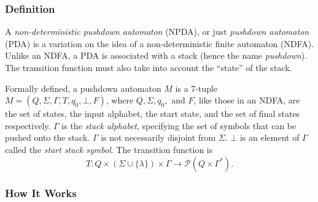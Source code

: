 \documentclass[12pt]{article}
\begin{document}

\subsubsection*{Definition}

A \emph{non-deterministic pushdown automaton} (NPDA), or just \emph{pushdown automaton} (PDA) is a variation on the idea of a non-deterministic finite automaton (NDFA).  Unlike an NDFA, a PDA is associated with a stack (hence the name \textit{pushdown}).  The transition function must also take into account the ``state'' of the stack.

Formally defined, a pushdown automaton $M$ is a 7-tuple $M=(Q,\Sigma,\Gamma,T,q_0,\bot,F)$, where 
$Q, \Sigma, q_0,$ and $F$, like those in an NDFA, are the set of states, the input alphabet, the start state, and the set of final states respectively.  $\Gamma$ is the \emph{stack alphabet}, specifying the set of symbols that can be pushed onto the stack.  $\Gamma$ is not necessarily disjoint from $\Sigma$.  $\bot$ is an element of $\Gamma$ called the \emph{start stack symbol}.  The transition function is $$T : Q\times(\Sigma\cup\{\lambda\})\times\Gamma\to\mathcal{P}(Q \times \Gamma^*).$$

\subsubsection*{How It Works}
\end{document}
